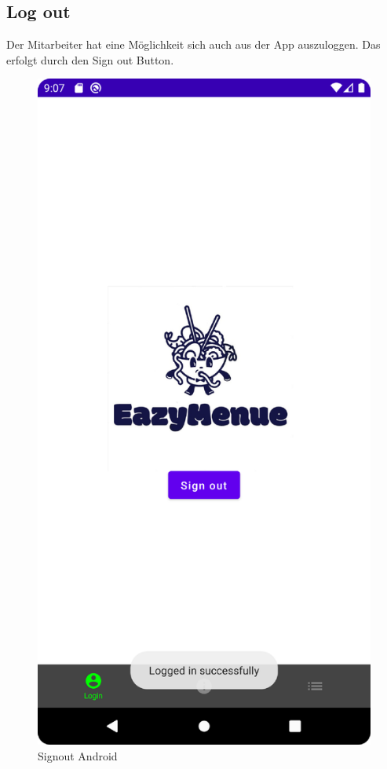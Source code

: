 \subsection{Log out}
Der Mitarbeiter hat eine Möglichkeit sich auch aus der App auszuloggen. Das erfolgt durch den Sign out Button.
\begin{figure}[htp]
    \centering
    \author{Bozidar Spasenovic}
    \includegraphics[scale=0.09]{pics/SignOutScreenAnndroid.png}
    \caption{Signout Android}
    \label{fig:impl:SignOutScreenAndroid}
\end{figure}

